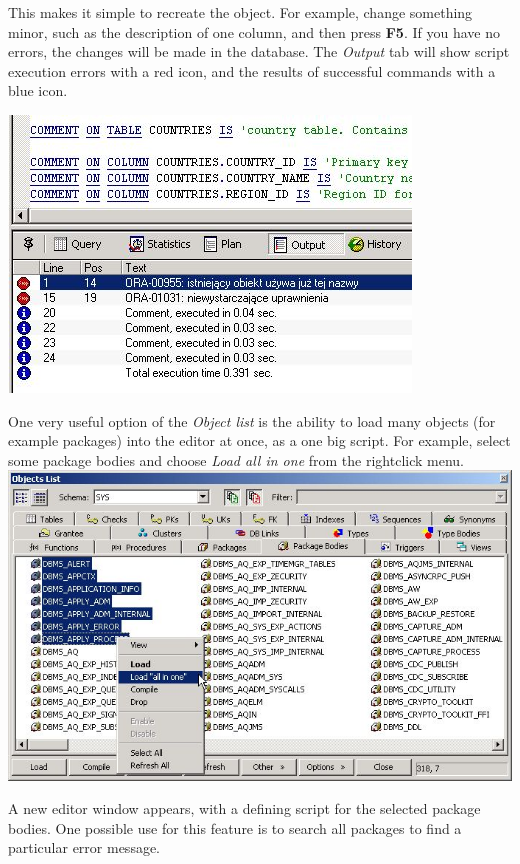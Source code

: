 \documentclass[a4paper,titlepage]{article}
\begin{document}
This makes it simple to recreate the object.
For example, change something minor, such as the description of one column, and then press \textbf{F5}. If you have no errors, the changes will be made in the database. The \emph{Output} tab will show script execution errors with a red icon, and the results of successful commands with a blue icon.
\begin{center}
\includegraphics[bb=0 0 404 278,scale=.7]{02objview04}
\end{center}

One very useful option of the \emph{Object list} is the ability to load many objects (for example packages) into the editor at once, as a one big script. For example, select some package bodies and choose \emph{Load all in one} from the rightclick menu.\\
\includegraphics[bb=0 0 684 421,width=\textwidth]{02objview05}

A new editor window appears, with a defining script for the selected package bodies. One possible use for this feature is to search all packages to find a particular error message.
\end{document}
